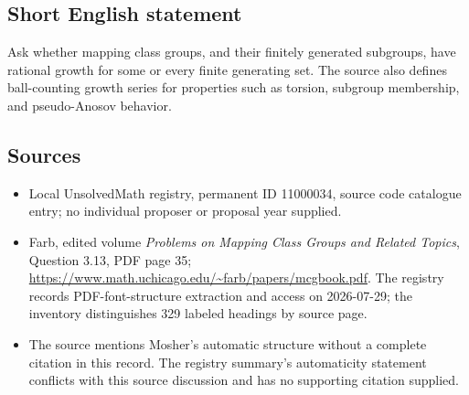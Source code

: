 \documentclass[11pt]{article}
\begin{document}
\subsection{Short English statement}
Ask whether mapping class groups, and their finitely generated subgroups, have rational growth for some or every finite generating set. The source also defines ball-counting growth series for properties such as torsion, subgroup membership, and pseudo-Anosov behavior.
\subsection{Sources}
\begin{itemize}
\item Local UnsolvedMath registry, permanent ID 11000034, source code catalogue entry; no individual proposer or proposal year supplied.
\item Farb, edited volume \emph{Problems on Mapping Class Groups and Related Topics}, Question 3.13, PDF page 35; \url{https://www.math.uchicago.edu/~farb/papers/mcgbook.pdf}. The registry records PDF-font-structure extraction and access on 2026-07-29; the inventory distinguishes 329 labeled headings by source page.
\item The source mentions Mosher's automatic structure without a complete citation in this record. The registry summary's automaticity statement conflicts with this source discussion and has no supporting citation supplied.
\end{itemize}
\end{document}
